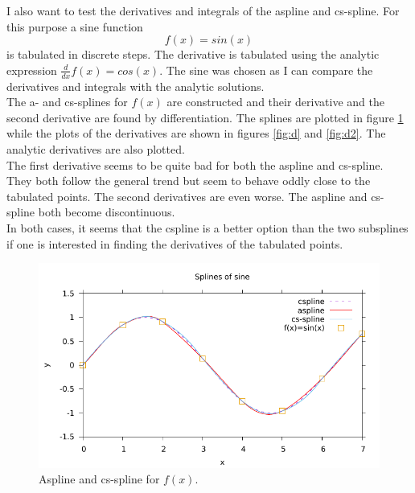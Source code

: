 \documentclass{article}
\begin{document}
I also want to test the derivatives and integrals of the aspline and cs-spline.
For this purpose a sine function $$f(x) = sin(x)$$ is tabulated in discrete steps. The derivative is tabulated
using the analytic expression $\frac{d}{dx}f(x)=cos(x)$.
The sine was chosen as I can compare the derivatives and integrals with the analytic solutions. 
\\
The a- and cs-splines for $f(x)$ are constructed and their 
derivative and the second derivative are found by differentiation. The splines are plotted in figure 
\ref{fig:sin} while the plots of the 
derivatives are shown in figures \ref{fig:d} and \ref{fig:d2}.
The analytic derivatives are also plotted.
\\
The first derivative seems to be quite bad for both the aspline and cs-spline. They both follow the general 
trend but seem to behave oddly close to the tabulated points.
The second derivatives are even worse. The aspline and cs-spline both become discontinuous.
\\
In both cases, it seems that the cspline is a better option than the two subsplines if one is interested in finding the 
derivatives of the tabulated points.
\begin{figure}
\centering
\includegraphics[width=\linewidth]{sinsplines.pdf}
\caption{Aspline and cs-spline for $f(x)$.}%
\label{fig:sin}
\end{figure}
\end{document}
